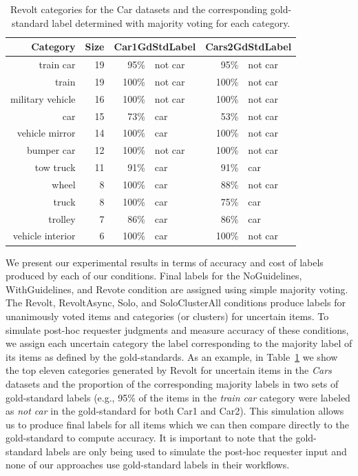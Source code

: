 \begin{table}[ht]
\footnotesize
\centering
\begin{tabular}{r r r l r l}
\hline
Category & Size & \multicolumn{2}{c}{Car1GdStdLabel} &\multicolumn{2}{c}{Cars2GdStdLabel} \\ 
\hline
train car           & 19    & 95\% & not car   & 95\% & not car \\
train               & 19    & 100\% & not car  & 100\% & not car \\ 
military vehicle    & 16    & 100\% & not car  & 100\% & not car \\ 
car                 & 15    & 73\% & car       & 53\% & not car \\         
vehicle mirror      & 14    & 100\% & car      & 100\% & not car \\         
bumper car          & 12    & 100\% & not car  & 100\% & not car \\ 
tow truck           & 11    & 91\% & car       & 91\% & car \\         
wheel               & 8     & 100\% & car      & 88\% & not car \\         
truck               & 8     & 100\% & car      & 75\% & car \\         
trolley             & 7     & 86\% & car       & 86\% & car \\         
vehicle interior    & 6     & 100\% & car      & 100\% & not car \\         
\hline                                    
\end{tabular}

\caption[Revolt categories for the Car datasets.]{Revolt categories for the Car datasets and the corresponding gold-standard label determined with majority voting for each category.} 
\label{tab:categories}
\end{table}





We present our experimental results in terms of accuracy and cost of labels produced by each of our conditions. Final labels for the NoGuidelines, WithGuidelines, and Revote condition are assigned using simple majority voting. The Revolt, RevoltAsync, Solo, and SoloClusterAll conditions produce labels for unanimously voted items and categories (or clusters) for uncertain items. 
To simulate post-hoc requester judgments and measure accuracy of these conditions, we assign each uncertain category the label corresponding to the majority label of its items as defined by the gold-standards.
As an example, in Table~\ref{tab:categories} we show the top eleven categories generated by Revolt for uncertain items in the \emph{Cars} datasets and the proportion of the corresponding majority labels in two sets of gold-standard labels (e.g., 95\% of the items in the \emph{train car} category were labeled as \emph{not car} in the gold-standard for both Car1 and Car2).  This simulation allows us to produce final labels for all items which we can then compare directly to the gold-standard to compute accuracy. It is important to note that the gold-standard labels are only being used to simulate the post-hoc requester input and none of our approaches use gold-standard labels in their workflows. 


